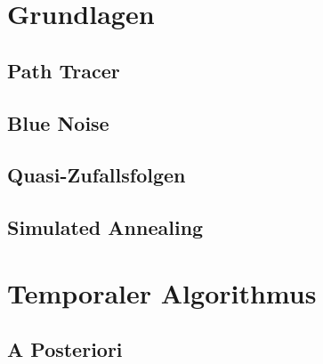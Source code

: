 \vfill
\chapter{Grundlagen}
\label{ch:Grundlagen}


\section{Path Tracer}
\label{ch:Content1:sec:PathTracer}



\newpage
\section{Blue Noise}
\label{ch:Content1:sec:BlueNoise}



\newpage
\section{Quasi-Zufallsfolgen}
\label{ch:Content1:sec:QuasiRandomSequences}



\section{Simulated Annealing}
\label{ch:Content2:sec:SimulatedAnnealing}




\newpage
\chapter{Temporaler Algorithmus}
\label{ch:TemporalerAlgorithmus}




\section{A Posteriori}
\label{ch:Content2:sec:APosteriori}




